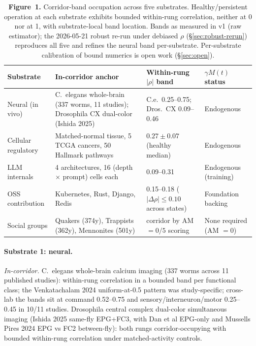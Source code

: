 \documentclass[11pt,a4paper]{article}
\begin{document}
\begin{table}[h]
\centering
\small
\renewcommand{\arraystretch}{1.2}
\begin{tabular}{@{}p{2.5cm}p{4cm}p{3.5cm}p{3cm}@{}}
\toprule
\textbf{Substrate} & \textbf{In-corridor anchor} & \textbf{Within-rung $|\rho|$ band} & \textbf{$\gamma M(t)$ status} \\
\midrule
Neural (in vivo) & C.~elegans whole-brain (337 worms, 11 studies); Drosophila CX dual-color (Ishida 2025) & C.e.\ 0.25--0.75; Dros.\ CX 0.09--0.46 & Endogenous \\
Cellular regulatory & Matched-normal tissue, 5 TCGA cancers, 50 Hallmark pathways & $0.27 \pm 0.07$ (healthy median) & Endogenous \\
LLM internals & 4 architectures, 16 (depth $\times$ prompt) cells each & 0.09--0.31 & Endogenous (training) \\
OSS contribution & Kubernetes, Rust, Django, Redis & 0.15--0.18 ($|\Delta\rho| \le 0.10$ across states) & Foundation backing \\
Social groups & Quakers (374y), Trappists (362y), Mennonites (501y) & corridor by AM $= 0/5$ scoring & None required (AM $= 0$) \\
\bottomrule
\end{tabular}
\caption{\textbf{Figure~1.} Corridor-band occupation across five substrates. Healthy/persistent operation at each substrate exhibits bounded within-rung correlation, neither at 0 nor at 1, with substrate-local band location. Bands as measured in v1 (raw estimator); the 2026-05-21 robust re-run under debiased $\rho$ (\S\ref{sec:robust-rerun}) reproduces all five and refines the neural band per-substrate. Per-substrate calibration of bound numerics is open work (\S\ref{sec:open}).}
\label{fig:corridor-occupation}
\end{table}

\paragraph{Substrate 1: neural.}

\emph{In-corridor.} C.~elegans whole-brain calcium imaging (337 worms across 11 published studies): within-rung correlation in a bounded band per functional class; the Venkatachalam 2024 uniform-at-0.5 pattern was study-specific; cross-lab the bands sit at command 0.52--0.75 and sensory/interneuron/motor 0.25--0.45 in 10/11 studies. Drosophila central complex dual-color simultaneous imaging (Ishida 2025 same-fly EPG+FC3, with Dan et al EPG-only and Mussells Pires 2024 EPG vs FC2 between-fly): both rungs corridor-occupying with bounded within-rung correlation under matched-activity controls.
\end{document}
